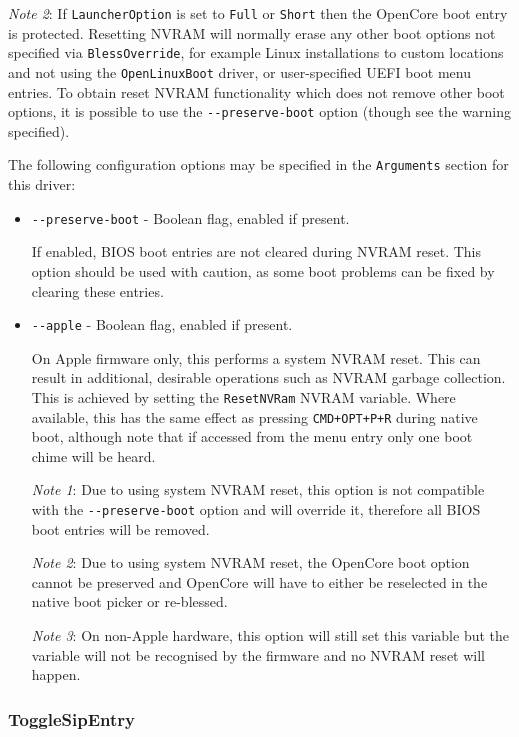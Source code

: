 \documentclass[]{article}
\makeatletter
\renewcommand{\label}[1]{%
\zref@wrapper@immediate{\oldlabel{#1}}}  %
\makeatother
\begin{document}
\emph{Note 2}: If \texttt{LauncherOption} is set to \texttt{Full} or \texttt{Short} then the
OpenCore boot entry is protected. Resetting NVRAM will normally erase any other boot options
not specified via \texttt{BlessOverride}, for example Linux installations to custom locations
and not using the \texttt{OpenLinuxBoot} driver, or user-specified UEFI boot menu entries.
To obtain reset NVRAM functionality which does not remove other boot options, it is possible
to use the \texttt{-{}-preserve-boot} option (though see the warning specified).

The following configuration options may be specified in the \texttt{Arguments} section for this driver:

\begin{itemize}
  \item \texttt{-{}-preserve-boot} - Boolean flag, enabled if present. \medskip

  If enabled, BIOS boot entries are not cleared during NVRAM reset. This option should
  be used with caution, as some boot problems can be fixed by clearing these entries. \medskip

  \item \texttt{-{}-apple} - Boolean flag, enabled if present. \medskip

  On Apple firmware only, this performs a system NVRAM reset. This can result in
  additional, desirable operations such as NVRAM garbage collection. This is achieved by
  setting the \texttt{ResetNVRam} NVRAM variable.
  Where available, this has the same effect as pressing \texttt{CMD+OPT+P+R} during native boot,
  although note that if accessed from the menu entry only one boot chime will be heard. \medskip

  \emph{Note 1}: Due to using system NVRAM reset, this option is not compatible with the \texttt{-{}-preserve-boot}
  option and will override it, therefore all BIOS boot entries will be removed. \medskip

  \emph{Note 2}: Due to using system NVRAM reset, the OpenCore boot option
  cannot be preserved and OpenCore will have to either be reselected in the native boot picker or
  re-blessed. \medskip

  \emph{Note 3}: On non-Apple hardware, this option will still set this variable but the
  variable will not be recognised by the firmware and no NVRAM reset will happen. \medskip
\end{itemize}

\subsubsection{ToggleSipEntry}\label{uefitogglesip}
\end{document}

